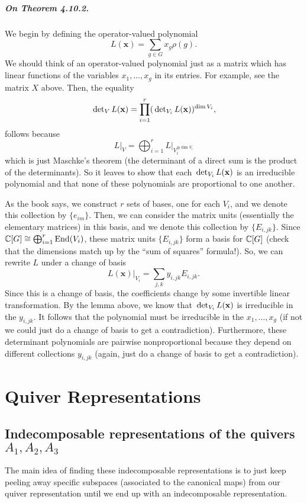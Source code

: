 \documentclass[oneside]{scrbook}
\begin{document}
\paragraph{On Theorem 4.10.2.} We begin by defining the operator-valued polynomial
\[L(\mathbf{x})=\sum_{g\in G}x_g\rho(g).\]
We should think of an operator-valued polynomial just as a matrix which has linear functions of the variables $x_1,\ldots,x_g$ in its entries. For example, see the matrix $X$ above. Then, the equality
\[\sideset{}{_V}\det L(\mathbf{x})=\prod_{i=1}^{r}(\sideset{}{_{V_i}}\det L(\mathbf{x}))^{\dim V_i},\]
follows because 
\[L\vert_V=\bigoplus_{i=1}^r L\vert_{V_i^{\oplus \dim V_i}}\]
which is just Maschke's theorem (the determinant of a direct sum is the product of the determinants). So it leaves to show that each $\sideset{}{_{V_i}}\det L(\mathbf{x})$ is an irreducible polynomial and that none of these polynomials are proportional to one another. 

As the book says, we construct $r$ sets of bases, one for each $V_i$, and we denote this collection by $\{e_{im}\}$. Then, we can consider the matrix units (essentially the elementary matrices) in this basis, and we denote this collection by $\{E_{i,jk}\}$. Since $\mathbb C[G]\cong \bigoplus_{i=1}^{r}\operatorname{End}(V_i)$, these matrix units $\{E_{i,jk}\}$ form a basis for $\mathbb C[G]$ (check that the dimensions match up by the ``sum of squares'' formula!). So, we can rewrite $L$ under a change of basis
\[L(\mathbf{x})\vert_{V_i}=\sum_{j,k}y_{i,jk}E_{i,jk}.\]
Since this is a change of basis, the coefficients change by some invertible linear transformation. By the lemma above, we know that $\sideset{}{_{V_i}}\det L(\mathbf{x})$ is irreducible in the $y_{i,jk}$. It follows that the polynomial must be irreducible in the $x_1,\ldots,x_g$ (if not we could just do a change of basis to get a contradiction). Furthermore, these determinant polynomials are pairwise nonproportional because they depend on different collections $y_{i,jk}$ (again, just do a change of basis to get a contradiction). 

\setcounter{chapter}{5}

\chapter{Quiver Representations}

\setcounter{section}{1}

\section{Indecomposable representations of the quivers $A_1,A_2,A_3$}
The main idea of finding these indecomposable representations is to just keep peeling away specific subspaces (associated to the canonical maps) from our quiver representation until we end up with an indecomposable representation. 
\end{document}
